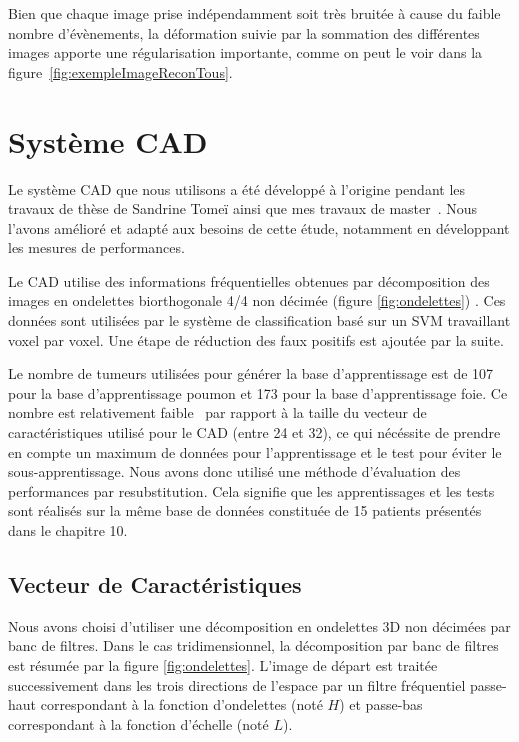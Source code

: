 Bien que chaque image prise indépendamment soit très bruitée à cause du faible nombre d'évènements, la déformation suivie par la sommation des différentes images apporte une régularisation importante, comme on peut le voir dans la figure~\ref{fig:exempleImageReconTous}. 

\section{Système CAD} %

Le système CAD que nous utilisons a été développé à l'origine pendant les travaux de thèse de Sandrine Tomeï ainsi que mes travaux de master~\cite{tomei2008automatic,lartizien2010impact}. Nous l'avons amélioré et adapté aux besoins de cette étude, notamment en développant les mesures de performances.


Le CAD utilise des informations fréquentielles obtenues par décomposition des images en ondelettes biorthogonale 4/4 non décimée (figure \ref{fig:ondelettes}) . Ces données sont utilisées par le système de classification basé sur un SVM travaillant voxel par voxel. Une étape de réduction des faux positifs est ajoutée par la suite.

Le nombre de tumeurs utilisées pour générer la base d'apprentissage est de 107 pour la base d'apprentissage poumon et 173 pour la base d'apprentissage foie. Ce nombre est relativement faible~\cite{hua2005optimal} par rapport à la taille du vecteur de caractéristiques utilisé pour le CAD (entre 24 et 32), ce qui nécéssite de prendre en compte un maximum de données pour l'apprentissage et le test pour éviter le sous-apprentissage. Nous avons donc utilisé une méthode d'évaluation des performances par resubstitution. Cela signifie que les apprentissages et les tests sont réalisés sur la même base de données constituée de 15 patients présentés dans le chapitre 10. %

\subsection{Vecteur de Caractéristiques}

Nous avons choisi d’utiliser une décomposition en ondelettes 3D non décimées par banc de filtres. Dans le cas tridimensionnel, la décomposition par banc de filtres est résumée par la figure \ref{fig:ondelettes}. L’image de départ est traitée successivement dans les trois directions de l’espace par un filtre fréquentiel passe-haut correspondant à la fonction d’ondelettes (noté $H$) et passe-bas correspondant à la fonction d’échelle (noté $L$). 


